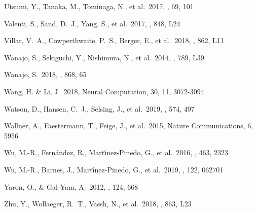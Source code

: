 \documentclass[twocolumn]{aastex63}
\begin{document}
\begin{thebibliography}{}
 Utsumi, Y., Tanaka, M., Tominaga, N., et al.\ 2017, \pasj, 69, 101

 Valenti, S., Sand, D.~J., Yang, S., et al.\ 2017, \apjl, 848, L24


 Villar, V.~A., Cowperthwaite, P.~S., Berger, E., et al.\ 2018, \apjl, 862, L11



 Wanajo, S., Sekiguchi, Y., Nishimura, N., et al.\ 2014, \apjl, 789, L39

 Wanajo, S.\ 2018, \apj, 868, 65

 Wang, H. \& Li, J.\ 2018, Neural Computation, 30, 11, 3072-3094

 Watson, D., Hansen, C.~J., Selsing, J., et al.\ 2019, \nat, 574, 497

 Wallner, A., Faestermann, T., Feige, J., et al.\ 2015, Nature Communications, 6, 5956


 Wu, M.-R., Fern{\'a}ndez, R., Mart{\'\i}nez-Pinedo, G., et al.\ 2016, \mnras, 463, 2323

 Wu, M.-R., Barnes, J., Mart{\'\i}nez-Pinedo, G., et al.\ 2019, \prl, 122, 062701

 Yaron, O., \& Gal-Yam, A.\ 2012, \pasp, 124, 668

 Zhu, Y., Wollaeger, R.~T., Vassh, N., et al.\ 2018, \apjl, 863, L23

\end{thebibliography}

\appendix{}
\end{document}
